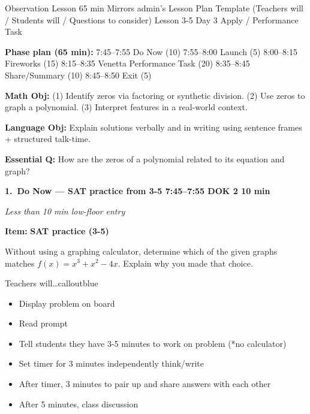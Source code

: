 \documentclass[10pt]{article}
\newcommand{\phasehead}[6]{%
  \vspace{0.25em}
  \noindent\colorbox{tealheader}{\parbox{\dimexpr\linewidth-2\fboxsep}{%
    \color{white}\bfseries #1.\ #2 \hfill \normalfont\bfseries #3 \textbullet{} DOK #4 \textbullet{} #5 min%
  }}\par
  {\small\itshape\color{framegray}#6}\par
  \smallskip
}
\newcommand{\itembox}[2]{%
  \begin{tcolorbox}[
    enhanced, breakable, colback=frameshade, colframe=dayblue,
    boxrule=0.6pt, arc=2pt, left=7pt, right=7pt, top=4pt, bottom=4pt
  ]
  \textbf{Item:} \textbf{#1}\par#2
  \end{tcolorbox}
}
\begin{document}
\daybanner%
{Observation Lesson \textbullet{} 65 min \textbullet{} Mirrors admin's Lesson Plan Template (Teachers will / Students will / Questions to consider)}%
{Lesson 3-5 \textbullet{} Day 3 \textbullet{} Apply / Performance Task}

\begin{tcolorbox}[
  enhanced, colback=calloutyellow, colframe=warmred,
  boxrule=0.5pt, arc=2pt, left=8pt, right=8pt, top=4pt, bottom=4pt
]
\textbf{Phase plan (65 min):} 7:45--7:55 Do Now (10) \textbullet{} 7:55--8:00 Launch (5) \textbullet{} 8:00--8:15 Fireworks (15) \textbullet{} 8:15--8:35 Venetta Performance Task (20) \textbullet{} 8:35--8:45 Share/Summary (10) \textbullet{} 8:45--8:50 Exit (5)
\end{tcolorbox}

\begin{tcolorbox}[
  enhanced, colback=lightgray, colframe=framegray!50,
  boxrule=0.5pt, arc=2pt, left=8pt, right=8pt, top=4pt, bottom=4pt
]
\textbf{Math Obj:} (1) Identify zeros via factoring or synthetic division. (2) Use zeros to graph a polynomial. (3) Interpret features in a real-world context.\par
\textbf{Language Obj:} Explain solutions verbally and in writing using sentence frames + structured talk-time.\par
\textbf{Essential Q:} How are the zeros of a polynomial related to its equation and graph?
\end{tcolorbox}

\phasehead{1}{Do Now --- SAT practice from 3-5}{7:45--7:55}{2}{10}{Less than 10 min \textbullet{} low-floor entry}

\itembox{SAT practice (3-5)}{Without using a graphing calculator, determine which of the given graphs matches $f(x) = x^3 + x^2 - 4x$. Explain why you made that choice.}

\begin{callout}{\IconSpeak{} Teachers will\ldots}{calloutblue}
\begin{itemize}[leftmargin=1.4em,itemsep=1pt,topsep=1pt]
  \item Display problem on board
  \item Read prompt
  \item Tell students they have 3-5 minutes to work on problem (*no calculator)
  \item Set timer for 3 minutes independently think/write
  \item After timer, 3 minutes to pair up and share answers with each other
  \item After 5 minutes, class discussion
\end{itemize}
\end{callout}
\end{document}
